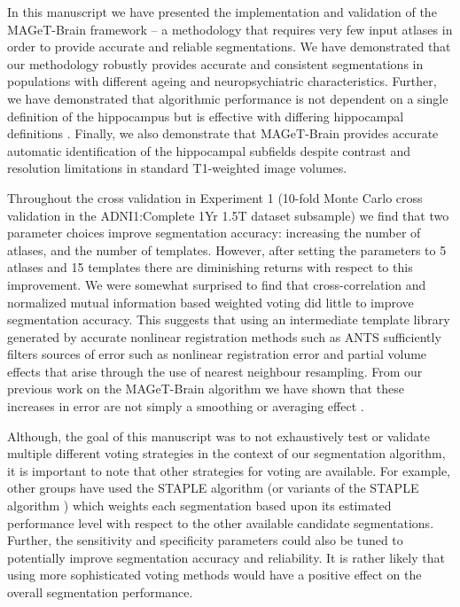 \documentclass{article}\usepackage{graphicx, color}
\newcommand{\mb}{MAGeT-Brain }
\newcommand{\ants}{ANTS }
\newcommand{\adnidataset}{ADNI1:Complete 1Yr 1.5T }
\begin{document}
In this manuscript we have presented the implementation and validation of the
\mb framework -- a methodology that requires very few input atlases in
order to provide accurate and reliable segmentations.  We have demonstrated that
our methodology robustly provides accurate and consistent segmentations in
populations with different ageing and neuropsychiatric characteristics.
Further, we have demonstrated that algorithmic performance is not dependent on a
single definition of the hippocampus but is effective with differing hippocampal
definitions \citep{Winterburn2013,Pruessner2000,Hsu2002}.  Finally, we also demonstrate
that \mb provides accurate automatic identification of the hippocampal
subfields despite contrast and resolution limitations in standard T1-weighted
image volumes. 

Throughout the cross validation in Experiment 1 (10-fold Monte Carlo cross 
validation in the
\adnidataset dataset subsample) we find that two parameter choices improve 
segmentation accuracy: increasing the number of atlases, and the number of
templates. However, after setting the parameters to 5 atlases and 15 templates
there are diminishing returns with respect to this improvement. We were
somewhat surprised to find that cross-correlation and normalized mutual
information based weighted voting did little to improve segmentation accuracy.
This suggests that using an intermediate template library generated by accurate
nonlinear registration methods such as \ants \citep{Avants2008} sufficiently filters
sources of error such as nonlinear registration error and partial volume effects
that arise through the use of nearest neighbour resampling. From our previous
work on the \mb algorithm we have shown that these increases in error
are not simply a smoothing or averaging effect \citep{MallarChakravarty2012}.

Although, the goal of this manuscript was to not exhaustively test or validate
multiple different voting strategies in the context of our segmentation
algorithm, it is important to note that other strategies for voting are
available.  For example, other groups have used the STAPLE algorithm
\citep{Warfield2004} (or variants of the STAPLE algorithm \citep{Robitaille2012})
which weights each segmentation based upon its estimated
performance level with respect to the other available candidate segmentations.
Further, the sensitivity and specificity parameters could also be tuned to
potentially improve segmentation accuracy and reliability.  It is rather likely
that using more sophisticated voting methods would have a positive effect on the
overall segmentation performance.  
\end{document}
